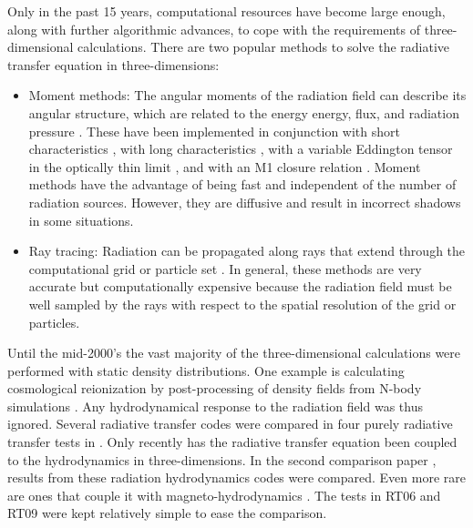 \documentclass[useAMS,usenatbib]{mn2e}
\begin{document}
Only in the past 15 years, computational resources have become large
enough, along with further algorithmic advances, to cope with the
requirements of three-dimensional calculations.  There are two popular
methods to solve the radiative transfer equation in three-dimensions:
%
\begin{itemize}
\item Moment methods: The angular moments of the radiation field can
  describe its angular structure, which are related to the energy
  energy, flux, and radiation pressure \citep{Auer70, Norman98}.
  These have been implemented in conjunction with short
  characteristics \citep[2D]{Stone92_RHD}, with long characteristics
  \citep{Finlator09}, with a variable Eddington tensor in the
  optically thin limit \citep[OTVET;][]{Gnedin01_OTVET, Petkova09},
  and with an M1 closure relation \citep{Gonzalez07, Aubert08}.
  Moment methods have the advantage of being fast and independent of
  the number of radiation sources.  However, they are diffusive and
  result in incorrect shadows in some situations.
\item Ray tracing:  Radiation can be propagated along rays that extend
  through the computational grid \citep[e.g.][]{Razoumov99, Abel99_RT,
    Ciardi01, Sokasian01, Whalen06, Rijkhorst06, Mellema06, Alvarez06,
    Trac07, Krumholz07_ART, Paardekooper10} or particle set
  \citep[e.g.][]{Susa06, Johnson07, Pawlik08, Pawlik10, Altay08,
    Hasegawa09}.  In general, these methods are very accurate but
  computationally expensive because the radiation field must be well
  sampled by the rays with respect to the spatial resolution of the
  grid or particles.
\end{itemize}
%
Until the mid-2000's the vast majority of the three-dimensional
calculations were performed with static density distributions.  One
example is calculating cosmological reionization by post-processing of
density fields from N-body simulations \citep{Ciardi01, Sokasian01,
  McQuinn07, Iliev06, Iliev07}.  Any hydrodynamical response to the
radiation field was thus ignored.  Several radiative transfer codes
were compared in four purely radiative transfer tests in
\citet[hereafter RT06]{RT06}.  Only recently has the radiative
transfer equation been coupled to the hydrodynamics in
three-dimensions.  In the second comparison paper \citep[hereafter
  RT09]{Iliev09}, results from these radiation hydrodynamics codes
were compared.  Even more rare are ones that couple it with
magneto-hydrodynamics \citep[e.g.][]{Krumholz07_ART}.  The tests in
RT06 and RT09 were kept relatively simple to ease the comparison.
\end{document}
